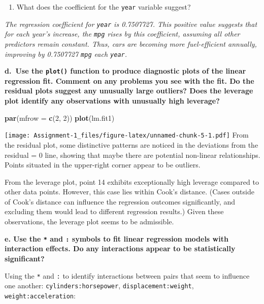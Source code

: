 \documentclass[
]{article}
\newenvironment{Shaded}{\begin{snugshade}}{\end{snugshade}}
\newcommand{\AttributeTok}[1]{\textcolor[rgb]{0.13,0.29,0.53}{#1}}
\newcommand{\DecValTok}[1]{\textcolor[rgb]{0.00,0.00,0.81}{#1}}
\newcommand{\FunctionTok}[1]{\textcolor[rgb]{0.13,0.29,0.53}{\textbf{#1}}}
\newcommand{\NormalTok}[1]{#1}
\providecommand{\tightlist}{%
  \setlength{\itemsep}{0pt}\setlength{\parskip}{0pt}}
\begin{document}
\begin{enumerate}
\def\labelenumi{\roman{enumi}.}
\setcounter{enumi}{2}
\tightlist
\item
  What does the coefficient for the \texttt{year} variable suggest?
\end{enumerate}

\emph{The regression coefficient for \texttt{year} is 0.7507727. This
positive value suggests that for each year's increase, the \texttt{mpg}
rises by this coefficient, assuming all other predictors remain
constant. Thus, cars are becoming more fuel-efficient annually,
improving by 0.7507727 \texttt{mpg} each \texttt{year}.}

\textbf{d.~Use the \texttt{plot()} function to produce diagnostic plots
of the linear regression fit. Comment on any problems you see with the
fit. Do the residual plots suggest any unusually large outliers? Does
the leverage plot identify any observations with unusually high
leverage?}

\begin{Shaded}
\begin{Highlighting}[]
\FunctionTok{par}\NormalTok{(}\AttributeTok{mfrow =} \FunctionTok{c}\NormalTok{(}\DecValTok{2}\NormalTok{, }\DecValTok{2}\NormalTok{))}
\FunctionTok{plot}\NormalTok{(lm.fit1)}
\end{Highlighting}
\end{Shaded}

\texttt{[image: Assignment-1\_files/figure-latex/unnamed-chunk-5-1.pdf]}
From the residual plot, some distinctive patterns are noticed in the
deviations from the residual = 0 line, showing that maybe there are
potential non-linear relationships. Points situated in the upper-right
corner appear to be outliers.

From the leverage plot, point 14 exhibits exceptionally high leverage
compared to other data points. However, this case lies within Cook's
distance. (Cases outside of Cook's distance can influence the regression
outcomes significantly, and excluding them would lead to different
regression results.) Given these observations, the leverage plot seems
to be admissible.

\textbf{e. Use the \texttt{*} and \texttt{:} symbols to fit linear
regression models with interaction effects. Do any interactions appear
to be statistically significant?}

Using the \texttt{*} and \texttt{:} to identify interactions between
pairs that seem to influence one another: \texttt{cylinders:horsepower},
\texttt{displacement:weight}, \texttt{weight:acceleration}:
\end{document}
